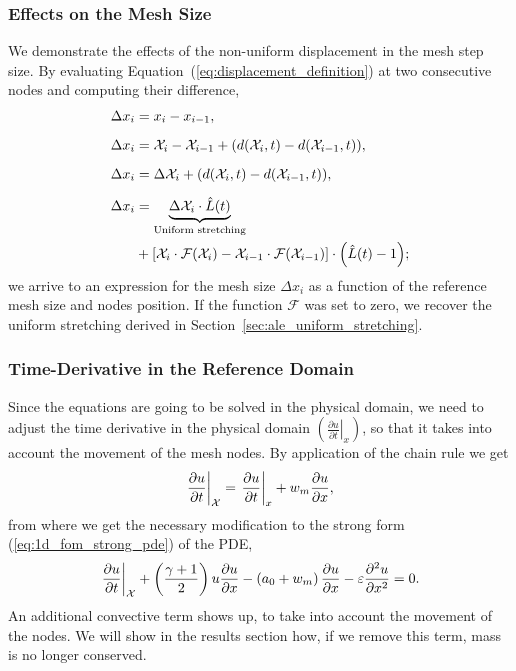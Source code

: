 \documentclass[../../thesis.tex]{subfiles}
\newcommand{\aleX}{\ensuremath{\mathcal{X}}}
\begin{document}
\subsubsection*{Effects on the Mesh Size}
We demonstrate the effects of the non-uniform displacement in the mesh step size.
By evaluating Equation~(\ref{eq:displacement_definition}) at two consecutive nodes
and computing their difference,
\begin{subequations}    
\begin{align}
    \Delta x_i &= x_i - x_{i-1},
    \\[2mm]
    \Delta x_i &= \aleX_i - \aleX_{i-1} + \qty(d\qty(\aleX_i, t) - d\qty(\aleX_{i-1}, t)),
    \\[2mm]
    \Delta x_i &= \Delta \aleX_i + \qty(d\qty(\aleX_i, t) - d\qty(\aleX_{i-1}, t)),
    \\[2mm]
    \Delta x_i &= 
    \underbrace{\Delta \aleX_i \cdot \hat{L}(t)}_{\text{Uniform stretching}}
    \nonumber\\
    &+\qty[\aleX_i \cdot \mathcal{F}\qty(\aleX_i)
    - \aleX_{i-1} \cdot \mathcal{F}\qty(\aleX_{i-1})] \cdot \qty(\hat{L}(t) - 1);
    \end{align}
\end{subequations}
we arrive to an expression for the mesh size $\Delta x_i$ 
as a function of the reference mesh size and nodes position.
If the function $\mathcal{F}$ was set to zero, 
we recover the uniform stretching derived in Section~\ref{sec:ale_uniform_stretching}.

\subsubsection{Time-Derivative in the Reference Domain}
Since the equations are going to be solved in the physical domain, we need to adjust the time derivative in the physical domain 
$\left(\left.\frac{\partial u}{\partial t}\right|_{x}\right)$, 
so that it takes into account the movement of the mesh nodes.
By application of the chain rule we get
\begin{equation}
    \left.\frac{\partial u}{\partial t}\right|_{\aleX} = 
    \left.\frac{\partial u}{\partial t}\right|_{x} + w_m \pdv{u}{x},
\end{equation}
from where we get the necessary modification to the strong form (\ref{eq:1d_fom_strong_pde}) of the PDE, 
\begin{equation}
    \left.\frac{\partial u}{\partial t}\right|_{\aleX} 
    + \left(\frac{\gamma+1}{2}\right) u \frac{\partial u}{\partial x} 
    - \left(a_0 + w_m\right)\frac{\partial u}{\partial x} 
    - \varepsilon \pdv[2]{u}{x} = 0.
\end{equation}
An additional convective term shows up, to take into account the movement of the nodes.
We will show in the results section how, if we remove this term, mass is no longer conserved.
\end{document}
